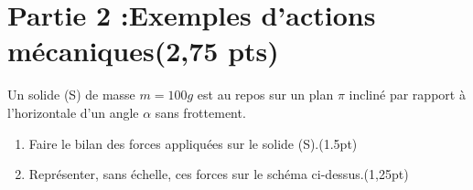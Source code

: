 \documentclass[12pt]{article}
\begin{document}
 \section*{Partie 2 :Exemples d’actions mécaniques\dotfill(2,75 pts)}


Un solide (S) de masse $m=100g$ est au repos sur un plan $\pi$ incliné par rapport à l’horizontale d’un angle $\alpha$ sans frottement.
\begin{enumerate}
	\item Faire le bilan des forces appliquées sur le solide (S).\dotfill(1.5pt)
	\item Représenter, sans échelle, ces forces sur le schéma ci-dessus.\dotfill(1,25pt)
\end{enumerate}
\end{document}
